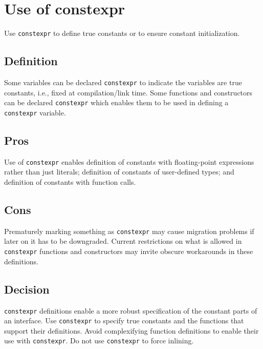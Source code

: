 
\section{Use of constexpr}\label{sec:use-of-constexpr}
Use \texttt{constexpr} to define true constants or to ensure constant initialization.

\subsection{Definition}
Some variables can be declared \texttt{constexpr} to indicate the variables are true constants, i.e., fixed at compilation/link time. Some functions and constructors can be declared \texttt{constexpr} which enables them to be used in defining a \texttt{constexpr} variable.

\subsection{Pros}
Use of \texttt{constexpr} enables definition of constants with floating-point expressions rather than just literals; definition of constants of user-defined types; and definition of constants with function calls.
\subsection{Cons}
Prematurely marking something as \texttt{constexpr} may cause migration problems if later on it has to be downgraded. Current restrictions on what is allowed in \texttt{constexpr} functions and constructors may invite obscure workarounds in these definitions.
\subsection{Decision}
\texttt{constexpr} definitions enable a more robust specification of the constant parts of an interface. Use \texttt{constexpr} to specify true constants and the functions that support their definitions. Avoid complexifying function definitions to enable their use with \texttt{constexpr}. Do not use \texttt{constexpr} to force inlining.
